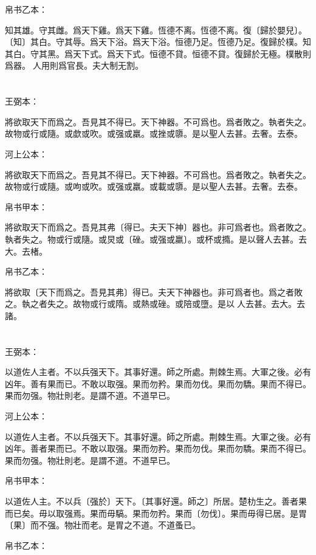 \documentclass[a5paper]{ctexbook}
\begin{document}
    帛书乙本：

    知其雄。守其雌。爲天下雞。爲天下雞。恆德不离。恆德不离。復〔歸於嬰兒〕。〔知〕其白。守其辱。爲天下浴。爲天下浴。恒德乃足。恆德乃足。復歸於樸。知其白。守其黑。爲天下式。爲天下式。恒德不貸。恒德不貸。復歸於无極。樸散則爲器。𦔻人用則爲官長。夫大制无割。

    \chapter{}
    王弼本：

    將欲取天下而爲之。吾見其不得已。天下神器。不可爲也。爲者敗之。執者失之。故物或行或隨。或歔或吹。或强或羸。或挫或隳。是以聖人去甚。去奢。去泰。

    河上公本：

    將欲取天下而爲之。吾見其不得已。天下神器。不可爲也。爲者敗之。執者失之。故物或行或隨。或呴或吹。或强或羸。或載或隳。是以聖人去甚。去奢。去泰。

    帛书甲本：

    將欲取天下而爲之。吾見其弗〔得已。夫天下神〕器也。非可爲者也。爲者敗之。執者失之。物或行或隨。或炅或〔䂳。或强或羸〕。或杯或撱。是以聲人去甚。去大。去楮。

    帛书乙本：

    將欲取〔天下而爲之。吾見其弗〕得已。夫天下神器也。非可爲者也。爲之者敗之。執之者失之。故物或行或隋。或熱或䂳。或陪或墮。是以𦔻人去甚。去大。去諸。

    \chapter{}
    王弼本：

    以道佐人主者。不以兵强天下。其事好還。師之所處。荆棘生焉。大軍之後。必有凶年。善有果而已。不敢以取强。果而勿矜。果而勿伐。果而勿驕。果而不得已。果而勿强。物壯則老。是謂不道。不道早已。

    河上公本：

    以道佐人主者。不以兵强天下。其事好還。師之所處。荆棘生焉。大軍之後。必有凶年。善者果而已。不敢以取强。果而勿矜。果而勿伐。果而勿驕。果而不得已。果而勿强。物壯則老。是謂不道。不道早已。

    帛书甲本：

    以道佐人主。不以兵〔强於〕天下。〔其事好還。師之〕所居。楚朸生之。善者果而已矣。毋以取强焉。果而毋䮦。果而勿矜。果而〔勿伐〕。果而毋得已居。是胃〔果〕而不强。物壯而老。是胃之不道。不道蚤已。

    帛书乙本：
\end{document}
